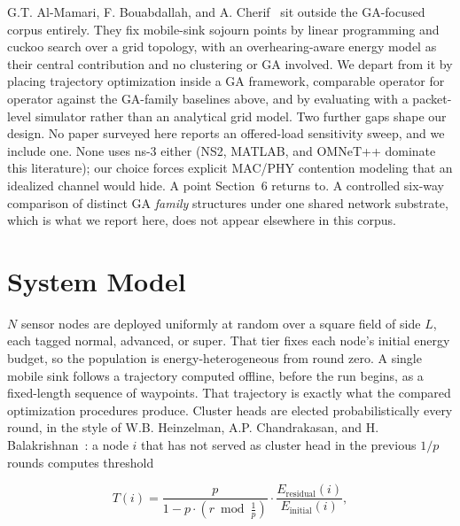\documentclass[runningheads]{llncs}
\begin{document}
G.T. Al-Mamari, F. Bouabdallah, and A.
Cherif~\cite{almamari2025mobilesink} sit
outside the GA-focused corpus entirely. They fix mobile-sink sojourn points
by linear programming and cuckoo search over a grid topology, with an
overhearing-aware energy model as their central contribution and no
clustering or GA involved. We depart from it by placing
trajectory optimization inside a GA framework, comparable operator for
operator against the GA-family baselines above, and by evaluating with a
packet-level simulator rather than an analytical grid model. Two further
gaps shape our design. No paper surveyed here reports an offered-load
sensitivity sweep, and we include one. None uses ns-3 either (NS2, MATLAB,
and OMNeT++ dominate this literature); our choice forces explicit MAC/PHY
contention modeling that an idealized channel would hide. A point
Section~6 returns to. A controlled six-way comparison of distinct GA
\emph{family} structures under one shared network substrate, which is what
we report here, does not appear elsewhere in this corpus.

\section{System Model}
\label{sec:model}

$N$ sensor nodes are deployed uniformly at random over a square field of
side $L$, each tagged normal, advanced, or super. That tier fixes each
node's initial energy budget, so the population is energy-heterogeneous
from round zero. A single mobile sink follows a trajectory computed
offline, before the run begins, as a fixed-length sequence of waypoints.
That trajectory is exactly what the compared optimization procedures
produce. Cluster heads are elected probabilistically every round, in the style of
W.B. Heinzelman, A.P. Chandrakasan, and H.
Balakrishnan~\cite{heinzelman2002leach}: a node $i$ that has not
served as cluster head in the previous $1/p$ rounds computes threshold

\begin{equation}
T(i) = \frac{p}{1 - p \cdot (r \bmod \frac{1}{p})} \cdot \frac{E_{\mathrm{residual}}(i)}{E_{\mathrm{initial}}(i)},
\label{eq:leach}
\end{equation}
\end{document}
